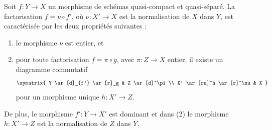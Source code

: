 \begin{lemma}
\label{lemma-characterize-normalization}
Soit $f : Y \to X$ un morphisme de schémas quasi-compact et quasi-séparé. La factorisation
$f = \nu \circ f'$, où $\nu : X' \to X$ est la normalisation de $X$
dans $Y$, est caractérisée par les deux propriétés
suivantes :
\begin{enumerate}
\item le morphisme $\nu$ est entier, et
\item pour toute factorisation $f = \pi \circ g$, avec $\pi : Z \to X$ entier,
il existe un diagramme commutatif
$$
\xymatrix{
Y \ar[d]_{f'} \ar[r]_g & Z \ar[d]^\pi \\
X' \ar[ru]^h \ar[r]^\nu & X
}
$$
pour un morphisme unique $h : X' \to Z$.
\end{enumerate}
De plus, le morphisme $f' : Y \to X'$ est dominant et dans (2) le morphisme
$h : X' \to Z$ est la normalisation de $Z$ dans $Y$.
\end{lemma}

